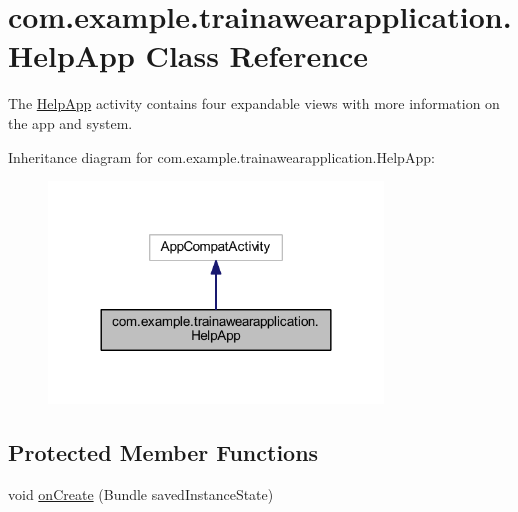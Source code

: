 \hypertarget{classcom_1_1example_1_1trainawearapplication_1_1_help_app}{}\section{com.\+example.\+trainawearapplication.\+Help\+App Class Reference}
\label{classcom_1_1example_1_1trainawearapplication_1_1_help_app}


The \mbox{\hyperlink{classcom_1_1example_1_1trainawearapplication_1_1_help_app}{Help\+App}} activity contains four expandable views with more information on the app and system.  




Inheritance diagram for com.\+example.\+trainawearapplication.\+Help\+App\+:
\nopagebreak
\begin{figure}[H]
\begin{center}
\leavevmode
\includegraphics[width=252pt]{classcom_1_1example_1_1trainawearapplication_1_1_help_app__inherit__graph}
\end{center}
\end{figure}
\subsection*{Protected Member Functions}
\begin{DoxyCompactItemize}
\item 
void \mbox{\hyperlink{classcom_1_1example_1_1trainawearapplication_1_1_help_app_a8fb144074fe5f839efbbdbfb16edd528}{on\+Create}} (Bundle saved\+Instance\+State)
\end{DoxyCompactItemize}
